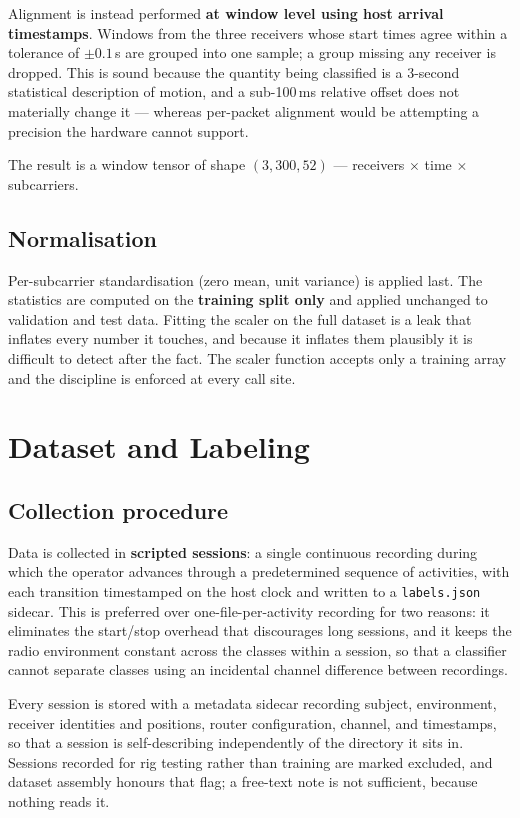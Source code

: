 Alignment is instead performed \textbf{at window level using host arrival
timestamps}. Windows from the three receivers whose start times agree within
a tolerance of $\pm 0.1$\,s are grouped into one sample; a group missing any
receiver is dropped. This is sound because the quantity being classified is
a 3-second statistical description of motion, and a sub-100\,ms relative
offset does not materially change it --- whereas per-packet alignment would
be attempting a precision the hardware cannot support.

The result is a window tensor of shape $(3, 300, 52)$ --- receivers $\times$
time $\times$ subcarriers.

\subsection{Normalisation}

Per-subcarrier standardisation (zero mean, unit variance) is applied last.
The statistics are computed on the \textbf{training split only} and applied
unchanged to validation and test data. Fitting the scaler on the full
dataset is a leak that inflates every number it touches, and because it
inflates them plausibly it is difficult to detect after the fact. The scaler
function accepts only a training array and the discipline is enforced at
every call site.

\section{Dataset and Labeling}

\subsection{Collection procedure}

Data is collected in \textbf{scripted sessions}: a single continuous
recording during which the operator advances through a predetermined
sequence of activities, with each transition timestamped on the host clock
and written to a \texttt{labels.json} sidecar. This is preferred over
one-file-per-activity recording for two reasons: it eliminates the
start/stop overhead that discourages long sessions, and it keeps the radio
environment constant across the classes within a session, so that a
classifier cannot separate classes using an incidental channel difference
between recordings.

Every session is stored with a metadata sidecar recording subject,
environment, receiver identities and positions, router configuration,
channel, and timestamps, so that a session is self-describing independently
of the directory it sits in. Sessions recorded for rig testing rather than
training are marked excluded, and dataset assembly honours that flag; a
free-text note is not sufficient, because nothing reads it.

